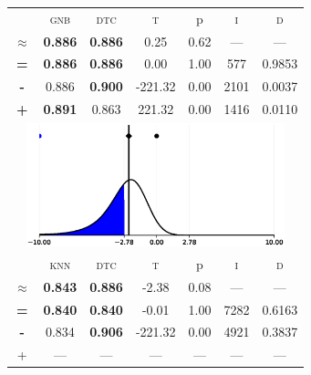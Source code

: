 \begin{tabular}{c||cc||c|c|c||c}
\midrule	&\textsc{gnb} & \textsc{dtc} & \textsc{t} & p & \textsc{i} & \textsc{d}\\
	\color{black} $\approx$ & \color{black} \bfseries 0.886 &\color{black}  \bfseries 0.886 & 0.25 & 0.62 & --- & ---\\\midrule
	{\bfseries\color{black}\tiny=}& \color{black} \bfseries 0.886 & \color{black} \bfseries 0.886 & 0.00 & 1.00 & 577 & \color{black} 0.9853\\
	{\bfseries\color{blue}\tiny-}& \color{blue}  0.886 & \color{blue} \bfseries 0.900 & -221.32 & 0.00 & 2101 & \color{blue} 0.0037\\
	{\bfseries\color{red}\tiny+}& \color{red} \bfseries 0.891 & \color{red}  0.863 & 221.32 & 0.00 & 1416 & \color{red} 0.0110\\
	\bottomrule
	\multicolumn{7}{c}{\includegraphics[width=7.5cm, trim=30 0 30 0]{figures/ionosphere_2.eps}}\\

\midrule	&\textsc{knn} & \textsc{dtc} & \textsc{t} & p & \textsc{i} & \textsc{d}\\
	\color{black} $\approx$ & \color{black} \bfseries 0.843 &\color{black}  \bfseries 0.886 & -2.38 & 0.08 & --- & ---\\\midrule
	{\bfseries\color{black}\tiny=}& \color{black} \bfseries 0.840 & \color{black} \bfseries 0.840 & -0.01 & 1.00 & 7282 & \color{black} 0.6163\\
	{\bfseries\color{blue}\tiny-}& \color{blue}  0.834 & \color{blue} \bfseries 0.906 & -221.32 & 0.00 & 4921 & \color{blue} 0.3837\\
	{\tiny+}& --- & --- & --- & --- & --- & ---\\
\bottomrule\end{tabular}


